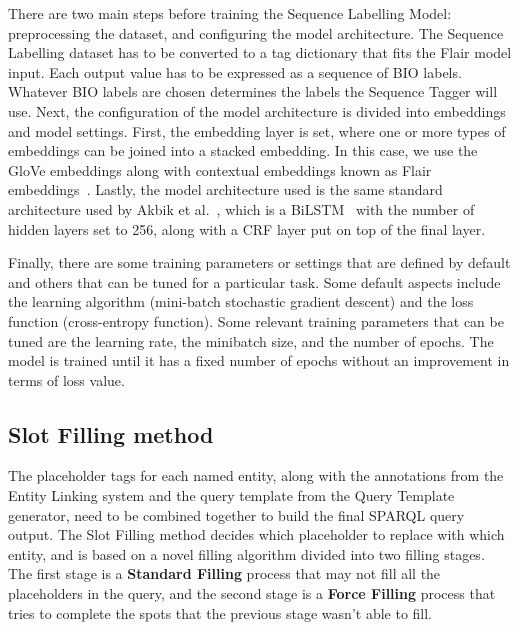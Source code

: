There are two main steps before training the Sequence Labelling Model: preprocessing the 
dataset, and configuring the model architecture. The Sequence Labelling dataset has to be 
converted to a tag dictionary that fits the Flair model input. Each output value has to be 
expressed as a sequence of BIO labels. Whatever BIO labels are chosen determines the labels 
the Sequence Tagger will use. Next, the configuration of the model architecture is divided 
into embeddings and model settings. First, the embedding layer is set, where one or more 
types of embeddings can be joined into a stacked embedding. In this case, we use the GloVe 
embeddings along with contextual embeddings known as Flair embeddings~\cite{seqlab:flair-AkbikBBRSV19}. 
Lastly, the model architecture used is the same standard architecture used by 
Akbik et al.~\cite{seqlab:contextual-emb-AkbikBV18}, which is a BiLSTM~\cite{seqlab:HuangXY15} 
with the number of hidden layers set to 256, along with a CRF layer put on top of the final 
layer. 

Finally, there are some training parameters or settings that are defined by default and 
others that can be tuned for a particular task. Some default aspects include the learning 
algorithm (mini-batch stochastic gradient descent) and the loss function (cross-entropy 
function). Some relevant training parameters that can be tuned are the learning rate, the 
minibatch size, and the number of epochs. The model is trained until it has a fixed number of 
epochs without an improvement in terms of loss value.

\subsection{Slot Filling method}
\label{cap3:system/slotFillModule/fillingMethod}
The placeholder tags for each named entity, along with the annotations from the Entity 
Linking system and the query template from the Query Template generator, need to be combined 
together to build the final SPARQL query output. The Slot Filling method decides which 
placeholder to replace with which entity, and is based on a novel filling algorithm divided 
into two filling stages. The first stage is a \textbf{Standard Filling} process that may not 
fill all the placeholders in the query, and the second stage is a \textbf{Force Filling} 
process that tries to complete the spots that the previous stage wasn’t able to fill.

